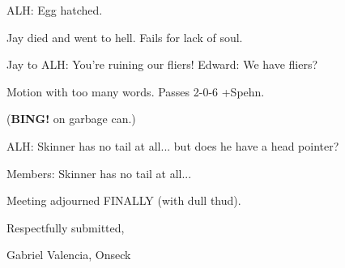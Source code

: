 \documentclass[12pt]{article}
\newcommand{\bing}{{\bf BING!} }
\begin{document}
ALH: Egg hatched.

Jay died and went to hell. Fails for lack of soul.

Jay to ALH: You're ruining our fliers! Edward: We have fliers?

Motion with too many words. Passes 2-0-6 +Spehn.

(\bing on garbage can.)

ALH: Skinner has no tail at all... but does he have a head pointer?

Members: Skinner has no tail at all...

\vspace{12pt}

\noindent
Meeting adjourned FINALLY (with dull thud).

\vspace{18pt}

\centerline{Respectfully submitted,}
\centerline{Gabriel Valencia, Onseck}
\end{document}
